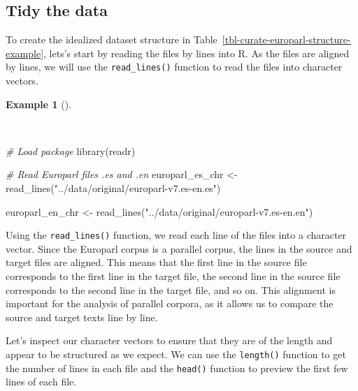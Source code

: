 \documentclass[
  letterpaper,
]{latex/krantz}
\newenvironment{Shaded}{\begin{snugshade}}{\end{snugshade}}
\newcommand{\CommentTok}[1]{\textcolor[rgb]{0.00,0.00,0.00}{\textit{#1}}}
\newcommand{\FunctionTok}[1]{\textcolor[rgb]{0.00,0.00,0.00}{#1}}
\newcommand{\NormalTok}[1]{\textcolor[rgb]{0.00,0.00,0.00}{#1}}
\newcommand{\OtherTok}[1]{\textcolor[rgb]{0.00,0.00,0.00}{#1}}
\newcommand{\StringTok}[1]{\textcolor[rgb]{0.00,0.00,0.00}{#1}}
\theoremstyle{definition}
\newtheorem{example}{Example}[chapter]
\theoremstyle{remark}
\begin{document}
\subsection{Tidy the data}\label{tidy-the-data}

To create the idealized dataset structure in
Table~\ref{tbl-curate-europarl-structure-example}, lets's start by
reading the files by lines into R. As the files are aligned by lines, we
will use the \texttt{read\_lines()} function to read the files into
character vectors.

\begin{example}[]\protect\hypertarget{exm-curate-europarl-readr}{}\label{exm-curate-europarl-readr}

~

\begin{Shaded}
\begin{Highlighting}[]
\CommentTok{\# Load package}
\FunctionTok{library}\NormalTok{(readr)}

\CommentTok{\# Read Europarl files .es and .en}
\NormalTok{europarl\_es\_chr }\OtherTok{\textless{}{-}}
  \FunctionTok{read\_lines}\NormalTok{(}\StringTok{"../data/original/europarl{-}v7.es{-}en.es"}\NormalTok{)}

\NormalTok{europarl\_en\_chr }\OtherTok{\textless{}{-}}
  \FunctionTok{read\_lines}\NormalTok{(}\StringTok{"../data/original/europarl{-}v7.es{-}en.en"}\NormalTok{)}
\end{Highlighting}
\end{Shaded}

\end{example}

Using the \texttt{read\_lines()} function, we read each line of the
files into a character vector. Since the Europarl corpus is a parallel
corpus, the lines in the source and target files are aligned. This means
that the first line in the source file corresponds to the first line in
the target file, the second line in the source file corresponds to the
second line in the target file, and so on. This alignment is important
for the analysis of parallel corpora, as it allows us to compare the
source and target texts line by line.

Let's inspect our character vectors to ensure that they are of the
length and appear to be structured as we expect. We can use the
\texttt{length()} function to get the number of lines in each file and
the \texttt{head()} function to preview the first few lines of each
file.
\end{document}
